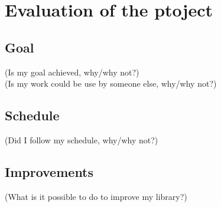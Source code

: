 \chapter{Evaluation of the ptoject}


\section{Goal}

(Is my goal achieved, why/why not?)\\
(Is my work could be use by someone else, why/why not?)


\section{Schedule}

(Did I follow my schedule, why/why not?)


\section{Improvements}

(What is it possible to do to improve my library?)



\clearpage
